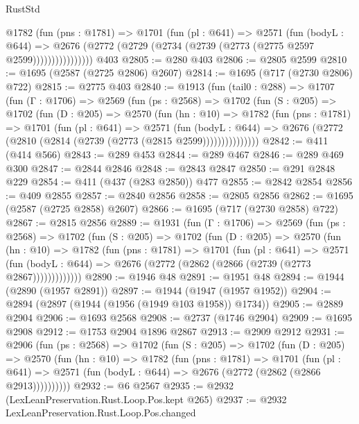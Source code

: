 \begin{lexlean}{RustStd}
\begin{coremodule}
                @1782
                  (fun (pns : @1781) =>
                  @1701
                    (fun (pl : @641) =>
                    @2571
                      (fun (bodyL : @644) =>
                      @2676 (@2772 (@2729 (@2734 (@2739 (@2773 (@2775 @2597 @2599))))))))))))))))
    @403
@2805 := @280 @403
@2806 := @2805 @2599
@2810 := @1695 (@2587 (@2725 @2806) @2607)
@2814 := @1695 (@717 (@2730 @2806) @722)
@2815 := @2775 @403
@2840 := @1913
    (fun (tail0 : @288) =>
    @1707
      (fun (Γ : @1706) =>
      @2569
        (fun (ps : @2568) =>
        @1702
          (fun (S : @205) =>
          @1702
            (fun (D : @205) =>
            @2570
              (fun (hn : @10) =>
              @1782
                (fun (pns : @1781) =>
                @1701
                  (fun (pl : @641) =>
                  @2571
                    (fun (bodyL : @644) =>
                    @2676 (@2772 (@2810 (@2814 (@2739 (@2773 (@2815 @2599)))))))))))))))
@2842 := @411 (@414 @566)
@2843 := @289 @453
@2844 := @289 @467
@2846 := @289 @469 @300
@2847 := @2844 @2846
@2848 := @2843 @2847
@2850 := @291 @2848 @229
@2854 := @411 (@437 (@283 @2850)) @477
@2855 := @2842 @2854
@2856 := @409 @2855
@2857 := @2840 @2856
@2858 := @2805 @2856
@2862 := @1695 (@2587 (@2725 @2858) @2607)
@2866 := @1695 (@717 (@2730 @2858) @722)
@2867 := @2815 @2856
@2889 := @1931
    (fun (Γ : @1706) =>
    @2569
      (fun (ps : @2568) =>
      @1702
        (fun (S : @205) =>
        @1702
          (fun (D : @205) =>
          @2570
            (fun (hn : @10) =>
            @1782
              (fun (pns : @1781) =>
              @1701
                (fun (pl : @641) =>
                @2571
                  (fun (bodyL : @644) => @2676 (@2772 (@2862 (@2866 (@2739 (@2773 @2867)))))))))))))
@2890 := @1946 @48
@2891 := @1951 @48
@2894 := @1944 (@2890 (@1957 @2891))
@2897 := @1944 (@1947 (@1957 @1952))
@2904 := @2894 (@2897 (@1944 (@1956 (@1949 @103 @1958)) @1734))
@2905 := @2889 @2904
@2906 := @1693 @2568
@2908 := @2737 (@1746 @2904)
@2909 := @1695 @2908
@2912 := @1753 @2904 @1896 @2867
@2913 := @2909 @2912
@2931 := @2906
    (fun (ps : @2568) =>
    @1702
      (fun (S : @205) =>
      @1702
        (fun (D : @205) =>
        @2570
          (fun (hn : @10) =>
          @1782
            (fun (pns : @1781) =>
            @1701
              (fun (pl : @641) =>
              @2571 (fun (bodyL : @644) => @2676 (@2772 (@2862 (@2866 @2913))))))))))
@2932 := @6 @2567
@2935 := @2932 (LexLeanPreservation.Rust.Loop.Pos.kept @265)
@2937 := @2932 LexLeanPreservation.Rust.Loop.Pos.changed

\end{coremodule}
\end{lexlean}
